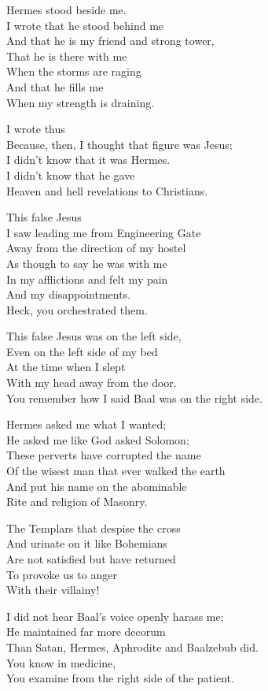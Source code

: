 \documentclass[
]{book}
\begin{document}
Hermes stood beside me.\\
I wrote that he stood behind me\\
And that he is my friend and strong tower,\\
That he is there with me\\
When the storms are raging\\
And that he fills me\\
When my strength is draining.

I wrote thus\\
Because, then, I thought that figure was Jesus;\\
I didn't know that it was Hermes.\\
I didn't know that he gave\\
Heaven and hell revelations to Christians.

This false Jesus\\
I saw leading me from Engineering Gate\\
Away from the direction of my hostel\\
As though to say he was with me\\
In my afflictions and felt my pain\\
And my disappointments.\\
Heck, you orchestrated them.

This false Jesus was on the left side,\\
Even on the left side of my bed\\
At the time when I slept\\
With my head away from the door.\\
You remember how I said Baal was on the right side.

Hermes asked me what I wanted;\\
He asked me like God asked Solomon;\\
These perverts have corrupted the name\\
Of the wisest man that ever walked the earth\\
And put his name on the abominable\\
Rite and religion of Masonry.

The Templars that despise the cross\\
And urinate on it like Bohemians\\
Are not satisfied but have returned\\
To provoke us to anger\\
With their villainy!

I did not hear Baal's voice openly harass me;\\
He maintained far more decorum\\
Than Satan, Hermes, Aphrodite and Baalzebub did.\\
You know in medicine,\\
You examine from the right side of the patient.
\end{document}
